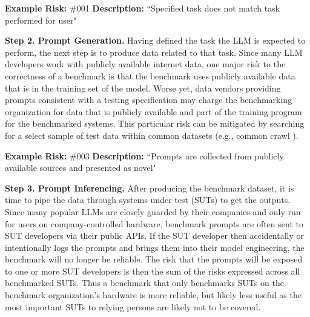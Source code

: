 \documentclass{article}
\begin{document}
\begin{center}
    \begin{tcolorbox}[colback=gray!10, colframe=black!50, width=\textwidth, boxrule=0.5mm, sharp corners, coltext=black]
        {\bf Example Risk:} \#001
        \newline
        {\bf Description:} ``Specified task does not match task performed for user"
    \end{tcolorbox}
\end{center}

{\bf Step 2. Prompt Generation.} Having defined the task the LLM is expected to perform, the next step is to produce data related to that task. Since many LLM developers work with publicly available internet data, one major risk to the correctness of a benchmark is that the benchmark uses publicly available data that is in the training set of the model. Worse yet, data vendors providing prompts consistent with a testing specification may charge the benchmarking organization for data that is publicly available and part of the training program for the benchmarked systems. This particular risk can be mitigated by searching for a select sample of test data within common datasets (e.g., common crawl \cite{commoncrawl}).

\begin{center}
    \begin{tcolorbox}[colback=gray!10, colframe=black!50, width=\textwidth, boxrule=0.5mm, sharp corners, coltext=black]
        {\bf Example Risk:} \#003
        \newline
        {\bf Description:} ``Prompts are collected from publicly available sources and presented as novel"
    \end{tcolorbox}
\end{center}

{\bf Step 3. Prompt Inferencing.} After producing the benchmark dataset, it is time to pipe the data through systems under test (SUTs) to get the outputs. Since many popular LLMs are closely guarded by their companies and only run for users on company-controlled hardware, benchmark prompts are often sent to SUT developers via their public APIs. If the SUT developer then accidentally or intentionally logs the prompts and brings them into their model engineering, the benchmark will no longer be reliable. The risk that the prompts will be exposed to one or more SUT developers is then the sum of the risks expressed across all benchmarked SUTs. Thus a benchmark that only benchmarks SUTs on the benchmark organization's hardware is more reliable, but likely less useful as the most important SUTs to relying persons are likely not to be covered.
\end{document}
